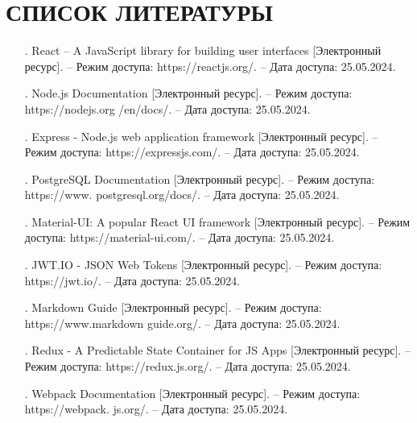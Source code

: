 \sectionbreak \section*{ 
    \gostTitleFont
    \redline
    СПИСОК ЛИТЕРАТУРЫ
}
\titlespace

{\gostFont

\begin{itemize}[leftmargin=2.15cm, labelwidth=0.65cm, labelsep=0.0cm] 

\item[\theimagecntr.] React – A JavaScript library for building user interfaces [Электронный ресурс]. – Режим доступа: https://reactjs.org/. – Дата доступа: 25.05.2024.
\addtocounter{imagecntr}{1}

\item[\theimagecntr.] Node.js Documentation [Электронный ресурс]. – Режим доступа: https://nodejs.org /en/docs/. – Дата доступа: 25.05.2024.
\addtocounter{imagecntr}{1}

\item[\theimagecntr.] Express - Node.js web application framework [Электронный ресурс]. – Режим доступа: https://expressjs.com/. – Дата доступа: 25.05.2024.
\addtocounter{imagecntr}{1}

\item[\theimagecntr.] PostgreSQL Documentation [Электронный ресурс]. – Режим доступа: https://www. postgresql.org/docs/. – Дата доступа: 25.05.2024.
\addtocounter{imagecntr}{1}

\item[\theimagecntr.] Material-UI: A popular React UI framework [Электронный ресурс]. – Режим доступа: https://material-ui.com/. – Дата доступа: 25.05.2024.
\addtocounter{imagecntr}{1}

\item[\theimagecntr.] JWT.IO - JSON Web Tokens [Электронный ресурс]. – Режим доступа: https://jwt.io/. – Дата доступа: 25.05.2024.
\addtocounter{imagecntr}{1}

\item[\theimagecntr.] Markdown Guide [Электронный ресурс]. – Режим доступа: https://www.markdown guide.org/. – Дата доступа: 25.05.2024.
\addtocounter{imagecntr}{1}

\item[\theimagecntr.] Redux - A Predictable State Container for JS Apps [Электронный ресурс]. – Режим доступа: https://redux.js.org/. – Дата доступа: 25.05.2024.
\addtocounter{imagecntr}{1}

\item[\theimagecntr.] Webpack Documentation [Электронный ресурс]. – Режим доступа: https://webpack. js.org/. – Дата доступа: 25.05.2024.
\addtocounter{imagecntr}{1}


\end{itemize}}
